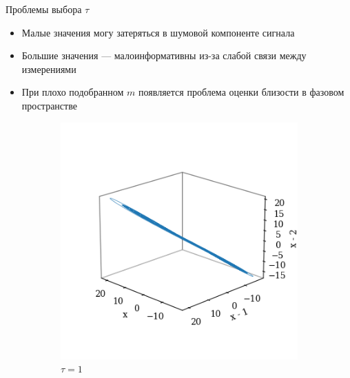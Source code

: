 \begin{frame}{Проблемы выбора $\tau$}
\begin{itemize}
    \item Малые значения могу затеряться в шумовой компоненте сигнала
    \item Большие значения --- малоинформативны из-за слабой связи между измерениями
    \item При плохо подобранном $m$ появляется проблема оценки близости в фазовом пространстве
\end{itemize}

\begin{figure}
 \begin{subfigure}[b]{0.24\textwidth}
    \includegraphics[width=\linewidth]{lecture_4/figs/tde_lorenz_tau_1.png}
    \caption{$\tau=1$}
  \end{subfigure}
  \begin{subfigure}[b]{0.24\textwidth}

\end{subfigure}
\end{figure}
\end{frame}
